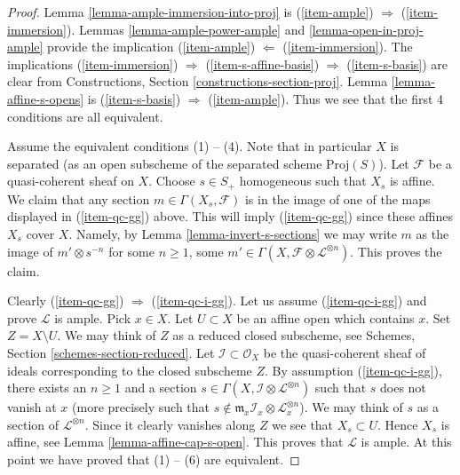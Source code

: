 \documentclass{stacks-project}
\theoremstyle{plain}
\theoremstyle{definition}
\theoremstyle{remark}
\numberwithin{equation}{subsection}
\begin{document}
\begin{proof}
Lemma \ref{lemma-ample-immersion-into-proj} is
(\ref{item-ample}) $\Rightarrow$ (\ref{item-immersion}).
Lemmas \ref{lemma-ample-power-ample} and \ref{lemma-open-in-proj-ample}
provide the implication
(\ref{item-ample}) $\Leftarrow$ (\ref{item-immersion}).
The implications (\ref{item-immersion}) $\Rightarrow$
(\ref{item-s-affine-basis}) $\Rightarrow$ (\ref{item-s-basis})
are clear from Constructions, Section \ref{constructions-section-proj}.
Lemma \ref{lemma-affine-s-opens} is
(\ref{item-s-basis}) $\Rightarrow$ (\ref{item-ample}).
Thus we see that the first 4 conditions are all equivalent.

\medskip\noindent
Assume the equivalent conditions (1) -- (4).
Note that in particular $X$ is separated (as an open
subscheme of the separated scheme $\text{Proj}(S)$).
Let $\mathcal{F}$ be a quasi-coherent sheaf on $X$.
Choose $s \in S_{+}$ homogeneous such that $X_s$ is affine.
We claim that any section $m \in \Gamma(X_s, \mathcal{F})$
is in the image of one of the maps displayed in
(\ref{item-qc-gg}) above. This will imply (\ref{item-qc-gg})
since these affines $X_s$ cover $X$.
Namely, by Lemma \ref{lemma-invert-s-sections} we may write
$m$ as the image of $m' \otimes s^{-n}$ for some
$n \geq 1$, some
$m' \in \Gamma(X, \mathcal{F} \otimes \mathcal{L}^{\otimes n})$.
This proves the claim.

\medskip\noindent
Clearly (\ref{item-qc-gg}) $\Rightarrow$ (\ref{item-qc-i-gg}).
Let us assume (\ref{item-qc-i-gg}) and prove $\mathcal{L}$ is
ample. Pick $x \in X$. Let $U \subset X$ be an affine open
which contains $x$. Set $Z = X \setminus U$. We may think of
$Z$ as a reduced closed subscheme, see
Schemes, Section \ref{schemes-section-reduced}.
Let $\mathcal{I} \subset \mathcal{O}_X$ be the quasi-coherent
sheaf of ideals corresponding to the closed subscheme $Z$.
By assumption (\ref{item-qc-i-gg}), there exists an $n \geq 1$ and a section
$s \in \Gamma(X, \mathcal{I} \otimes \mathcal{L}^{\otimes n})$
such that $s$ does not vanish at $x$ (more precisely such that
$s \not \in \mathfrak m_x \mathcal{I}_x \otimes \mathcal{L}_x^{\otimes n}$).
We may think of $s$ as a section of $\mathcal{L}^{\otimes n}$.
Since it clearly vanishes along $Z$ we see that
$X_s \subset U$. Hence $X_s$ is affine, see
Lemma \ref{lemma-affine-cap-s-open}.
This proves that $\mathcal{L}$ is ample.
At this point we have proved that (1) -- (6) are equivalent.


\end{proof}
\end{document}
